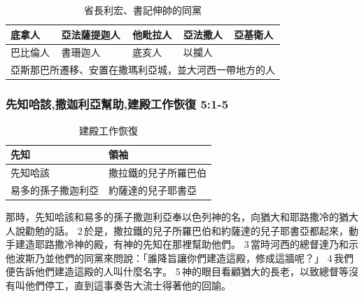 \begin{table}[H]
\centering 
\begin{tabular}{p{2cm}|p{2.5cm}|p{2cm}|p{2cm}|p{2cm}}
\hline
\hline
底拿人&亞法薩提迦人& 他毗拉人&亞法撒人&亞基衛人 \\\hline
巴比倫人&書珊迦人&底亥人&以攔人&\\\hline
\multicolumn{5}{|c|}{亞斯那巴所遷移、安置在撒瑪利亞城，並大河西一帶地方的人}\\\hline
\end{tabular}
\caption{省長利宏、書記伸帥的同黨}
\end{table}


\subsubsection{先知哈該,撒迦利亞幫助,建殿工作恢復 5:1-5}
\begin{table}[!hbp]
\centering 
\begin{tabular}{|p{4cm}|p{5cm}|}
\hline
\hline
先知& 領袖 \\\hline
先知哈該&撒拉鐵的兒子所羅巴伯\\\hline
易多的孫子撒迦利亞&約薩達的兒子耶書亞\\\hline
\end{tabular}
\caption{建殿工作恢復}
\end{table}
那時，先知哈該和易多的孫子撒迦利亞奉以色列神的名，向猶大和耶路撒冷的猶大人說勸勉的話。 2 於是，撒拉鐵的兒子所羅巴伯和約薩達的兒子耶書亞都起來，動手建造耶路撒冷神的殿，有神的先知在那裡幫助他們。 3 當時河西的總督達乃和示他波斯乃並他們的同黨來問說：「誰降旨讓你們建造這殿，修成這牆呢？」 4 我們便告訴他們建造這殿的人叫什麼名字。 5 神的眼目看顧猶大的長老，以致總督等沒有叫他們停工，直到這事奏告大流士得著他的回諭。

